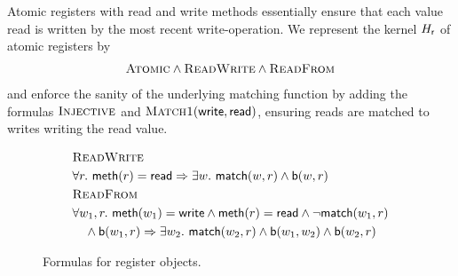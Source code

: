\begin{example}

  Atomic registers with {\sf read} and {\sf write} methods essentially ensure
  that each value read is written by the most recent {\sc write}-operation.
  We represent the kernel $H_{\sf r}$ of atomic registers by
  \begin{align*}
    \textsc{Atomic} \land \textsc{ReadWrite} \land \textsc{ReadFrom}
  \end{align*}
  and enforce the sanity of the underlying matching function by adding the
  formulas $\textsc{Injective}$ and $\textsc{Match1}({\sf write},{\sf read})$,
  ensuring reads are matched to writes writing the read value.

\end{example}

\begin{figure}
  \footnotesize
  \begin{align*}
    & \textsc{ReadWrite} \\
    & \forall r.\ {\sf meth}(r) = {\sf read} \implies \exists w.\ {\sf match}(w,r) \land {\sf b}(w,r)
    \\
    & \textsc{ReadFrom} \\
    & \forall w_1, r.\ {\sf meth}(w_1) = {\sf write} \land {\sf meth}(r) = {\sf read} \land \neg {\sf match}(w_1,r) \\
    & \quad \land {\sf b}(w_1,r) \implies \exists w_2.\ {\sf match}(w_2,r) \land {\sf b}(w_1,w_2) \land {\sf b}(w_2,r)
  \end{align*}
  \caption{Formulas for register objects.}
  \label{fig:formulas:register}
\end{figure}

